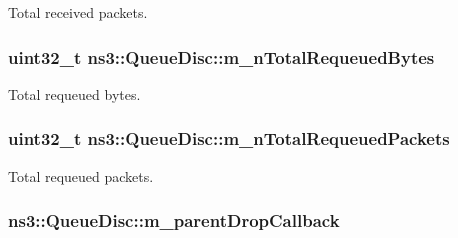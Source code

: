 Total received packets. 

\subsubsection[{\texorpdfstring{m\+\_\+n\+Total\+Requeued\+Bytes}{m_nTotalRequeuedBytes}}]{\setlength{\rightskip}{0pt plus 5cm}uint32\+\_\+t ns3\+::\+Queue\+Disc\+::m\+\_\+n\+Total\+Requeued\+Bytes\hspace{0.3cm}{\ttfamily [private]}}\hypertarget{classns3_1_1QueueDisc_aa1c2f1af9a66078a2507d2632eef82ae}{}\label{classns3_1_1QueueDisc_aa1c2f1af9a66078a2507d2632eef82ae}


Total requeued bytes. 

\subsubsection[{\texorpdfstring{m\+\_\+n\+Total\+Requeued\+Packets}{m_nTotalRequeuedPackets}}]{\setlength{\rightskip}{0pt plus 5cm}uint32\+\_\+t ns3\+::\+Queue\+Disc\+::m\+\_\+n\+Total\+Requeued\+Packets\hspace{0.3cm}{\ttfamily [private]}}\hypertarget{classns3_1_1QueueDisc_a098d0d792113e93b94c8f89178ac2af6}{}\label{classns3_1_1QueueDisc_a098d0d792113e93b94c8f89178ac2af6}


Total requeued packets. 

\subsubsection[{\texorpdfstring{m\+\_\+parent\+Drop\+Callback}{m_parentDropCallback}}]{ ns3\+::\+Queue\+Disc\+::m\+\_\+parent\+Drop\+Callback\hspace{0.3cm}{\ttfamily [private]}}\hypertarget{classns3_1_1QueueDisc_ac0ecab7418e3e1e6453f9cf1b194b74f}{}\label{classns3_1_1QueueDisc_ac0ecab7418e3e1e6453f9cf1b194b74f}


